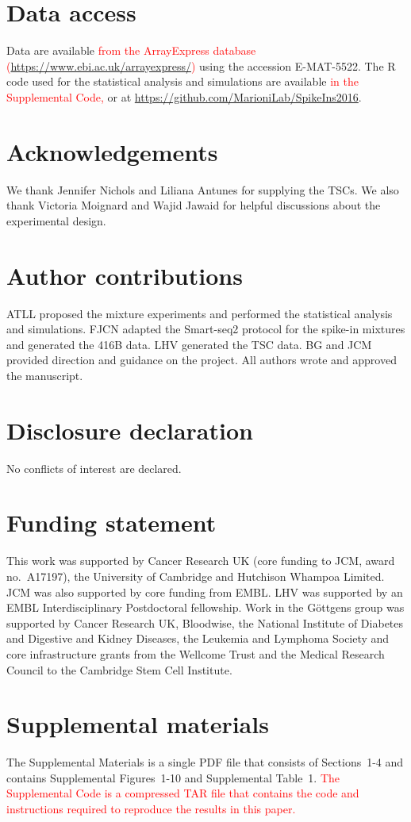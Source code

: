 \documentclass{article}
\newcommand{\suppfigindex}{10}
\newcommand{\suppsecsim}{4}
\newcommand{\revised}[1]{\textcolor{red}{#1}}
\begin{document}
\section*{Data access}
Data are available \revised{from the ArrayExpress database (\url{https://www.ebi.ac.uk/arrayexpress/})} using the accession E-MAT-5522.
The R code used for the statistical analysis and simulations are available \revised{in the Supplemental Code,} or at \url{https://github.com/MarioniLab/SpikeIns2016}.

\section*{Acknowledgements}
We thank Jennifer Nichols and Liliana Antunes for supplying the TSCs.
We also thank Victoria Moignard and Wajid Jawaid for helpful discussions about the experimental design.

\section*{Author contributions}
ATLL proposed the mixture experiments and performed the statistical analysis and simulations.
FJCN adapted the Smart-seq2 protocol for the spike-in mixtures and generated the 416B data.
LHV generated the TSC data.
BG and JCM provided direction and guidance on the project.
All authors wrote and approved the manuscript.

\section*{Disclosure declaration}
No conflicts of interest are declared.

\section*{Funding statement}
This work was supported by Cancer Research UK (core funding to JCM, award no.\ A17197), the University of Cambridge and Hutchison Whampoa Limited.
JCM was also supported by core funding from EMBL.
LHV was supported by an EMBL Interdisciplinary Postdoctoral fellowship.
Work in the G\"ottgens group was supported by Cancer Research UK, Bloodwise, the National Institute of Diabetes and Digestive and Kidney Diseases, the Leukemia and Lymphoma Society and core infrastructure grants from the Wellcome Trust and the Medical Research Council to the Cambridge Stem Cell Institute.

\section*{Supplemental materials}
The Supplemental Materials is a single PDF file that consists of Sections~1-\suppsecsim{} and contains Supplemental Figures~1-\suppfigindex{} and Supplemental Table~1.
\revised{The Supplemental Code is a compressed TAR file that contains the code and instructions required to reproduce the results in this paper.}

\printbibliography
\end{document}
